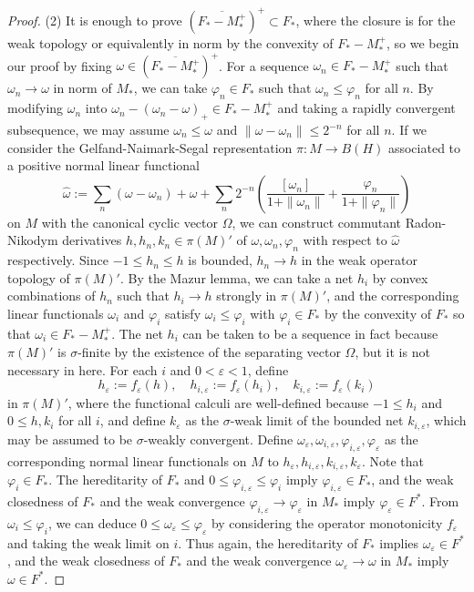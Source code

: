 \documentclass[a4paper]{amsart}
\newcommand{\e}{\varepsilon}
\theoremstyle{plain}
\theoremstyle{definition}
\begin{document}
\begin{proof}
(2)
It is enough to prove $(\overline{F_*-M_*^+})^+\subset F_*$, where the closure is for the weak topology or equivalently in norm by the convexity of $F_*-M_*^+$, so we begin our proof by fixing $\omega\in(\overline{F_*-M_*^+})^+$.
For a sequence $\omega_n\in F_*-M_*^+$ such that $\omega_n\to\omega$ in norm of $M_*$, we can take $\varphi_n\in F_*$ such that $\omega_n\le\varphi_n$ for all $n$.
By modifying $\omega_n$ into $\omega_n-(\omega_n-\omega)_+\in F_*-M_*^+$ and taking a rapidly convergent subsequence, we may assume $\omega_n\le\omega$ and $\|\omega-\omega_n\|\le2^{-n}$ for all $n$.
If we consider the Gelfand-Naimark-Segal representation $\pi:M\to B(H)$ associated to a positive normal linear functional \[\widehat\omega:=\sum_n(\omega-\omega_n)+\omega+\sum_n2^{-n}\left(\frac{[\omega_n]}{1+\|\omega_n\|}+\frac{\varphi_n}{1+\|\varphi_n\|}\right)\]
on $M$ with the canonical cyclic vector $\Omega$, we can construct commutant Radon-Nikodym derivatives $h,h_n,k_n\in\pi(M)'$ of $\omega,\omega_n,\varphi_n$ with respect to $\widehat\omega$ respectively.
Since $-1\le h_n\le h$ is bounded, $h_n\to h$ in the weak operator topology of $\pi(M)'$.
By the Mazur lemma, we can take a net $h_i$ by convex combinations of $h_n$ such that $h_i\to h$ strongly in $\pi(M)'$, and the corresponding linear functionals $\omega_i$ and $\varphi_i$ satisfy $\omega_i\le\varphi_i$ with $\varphi_i\in F_*$ by the convexity of $F_*$ so that $\omega_i\in F_*-M_*^+$.
The net $h_i$ can be taken to be a sequence in fact because $\pi(M)'$ is $\sigma$-finite by the existence of the separating vector $\Omega$, but it is not necessary in here.
For each $i$ and $0<\e<1$, define
\[h_\e:=f_\e(h),\quad h_{i,\e}:=f_\e(h_i),\quad k_{i,\e}:=f_\e(k_i)\]
in $\pi(M)'$, where the functional calculi are well-defined because $-1\le h_i$ and $0\le h,k_i$ for all $i$, and define $k_\e$ as the $\sigma$-weak limit of the bounded net $k_{i,\e}$, which may be assumed to be $\sigma$-weakly convergent.
Define $\omega_\e,\omega_{i,\e},\varphi_{i,\e},\varphi_\e$ as the corresponding normal linear functionals on $M$ to $h_\e,h_{i,\e},k_{i,\e},k_\e$.
Note that $\varphi_i\in F_*$.
The hereditarity of $F_*$ and $0\le\varphi_{i,\e}\le\varphi_i$ imply $\varphi_{i,\e}\in F_*$, and the weak closedness of $F_*$ and the weak convergence $\varphi_{i,\e}\to\varphi_\e$ in $M_*$ imply $\varphi_\e\in F^*$.
From $\omega_i\le\varphi_i$, we can deduce $0\le\omega_\e\le\varphi_\e$ by considering the operator monotonicity $f_\e$ and taking the weak limit on $i$.
Thus again, the hereditarity of $F_*$ implies $\omega_\e\in F^*$, and the weak closedness of $F_*$ and the weak convergence $\omega_\e\to\omega$ in $M_*$ imply $\omega\in F^*$.
\end{proof}
\end{document}
